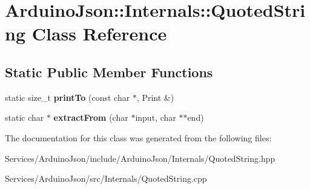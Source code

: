 \hypertarget{class_arduino_json_1_1_internals_1_1_quoted_string}{}\section{Arduino\+Json\+:\+:Internals\+:\+:Quoted\+String Class Reference}
\label{class_arduino_json_1_1_internals_1_1_quoted_string}
\subsection*{Static Public Member Functions}
\begin{DoxyCompactItemize}
\item 
\hypertarget{class_arduino_json_1_1_internals_1_1_quoted_string_a2719c00c59773ec60720e03c8a9b20c4}{}static size\+\_\+t {\bfseries print\+To} (const char $\ast$, Print \&)\label{class_arduino_json_1_1_internals_1_1_quoted_string_a2719c00c59773ec60720e03c8a9b20c4}

\item 
\hypertarget{class_arduino_json_1_1_internals_1_1_quoted_string_acb881b13714b9ae36a67ba8e33181bf1}{}static char $\ast$ {\bfseries extract\+From} (char $\ast$input, char $\ast$$\ast$end)\label{class_arduino_json_1_1_internals_1_1_quoted_string_acb881b13714b9ae36a67ba8e33181bf1}

\end{DoxyCompactItemize}


The documentation for this class was generated from the following files\+:\begin{DoxyCompactItemize}
\item 
Services/\+Arduino\+Json/include/\+Arduino\+Json/\+Internals/Quoted\+String.\+hpp\item 
Services/\+Arduino\+Json/src/\+Internals/Quoted\+String.\+cpp\end{DoxyCompactItemize}
